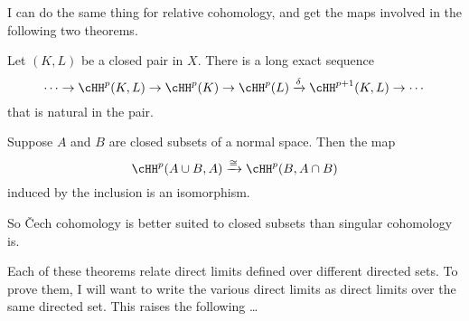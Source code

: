 I can do the same thing for relative cohomology, and get the maps
involved in the following two theorems.
\begin{theorem}
\label{cech-les}
Let $(K,L)$ be a closed pair in $X$. There is a long exact sequence
\begin{equation*}
\cdots\to\cHH^p(K,L)\to\cHH^p(K)\to\cHH^p(L)\xrightarrow{\delta}\cHH^{p+1}(K,L)\to\cdots
\end{equation*}
that is natural in the pair. 
\end{theorem}
\begin{theorem}[Excision]
\label{cech-excision}
Suppose $A$ and $B$ are closed subsets of a normal space.  
Then the map
\[
\cHH^p(A\cup B,A)\xrightarrow{\cong}\cHH^p(B,A\cap B)
\] 
induced by the inclusion is an isomorphism.
\end{theorem}
So \v{C}ech cohomology is better suited to closed subsets than singular
cohomology is. 

Each of these theorems relate direct limits defined over different directed 
sets. To prove them, I will want to write the various direct limits
as direct limits over the same directed set. This raises the following \ldots

